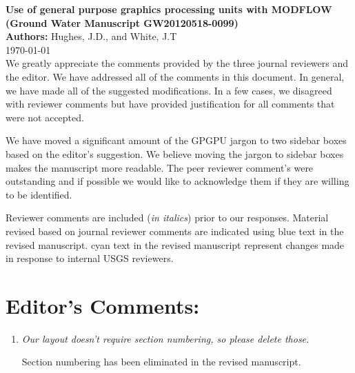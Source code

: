 \documentclass[12pt]{article} %
\begin{document}
\noindent
\textbf{Use of general purpose graphics processing units with MODFLOW \\ (Ground Water Manuscript GW20120518-0099) }\\

\noindent
\textbf{Authors:} Hughes, J.D., and White, J.T \\

\today \\

\noindent
We greatly appreciate the comments provided by the three journal reviewers and the editor. We have addressed all of the comments in this document. In general, we have made all of the suggested modifications. In a few cases, we disagreed with reviewer comments but have provided justification for all comments that were not accepted.

We have moved a significant amount of the GPGPU jargon to two sidebar boxes based on the editor's suggestion. We believe moving the jargon to sidebar boxes makes the manuscript more readable. The peer reviewer comment's were outstanding and if possible we would like to acknowledge them if they are willing to be identified.

Reviewer comments are included (\textit{in italics}) prior to our responses. Material revised based on journal reviewer comments are indicated using \color{blue} blue \color{black}text in the revised manuscript. \color{cyan} cyan \color{black}text in the revised manuscript represent changes made in response to internal USGS reviewers. 

\section*{Editor's Comments:}
\begin{enumerate}
\item \textit{Our layout doesn't require section numbering, so please delete those.}

Section numbering has been eliminated in the revised manuscript.

\end{enumerate}
\end{document}

